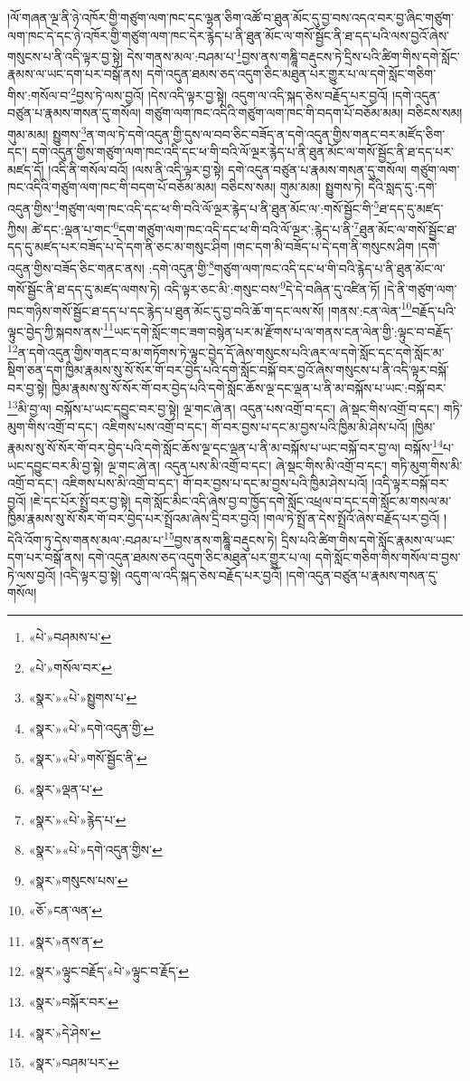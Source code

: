 །ལོ་གཞན་ལྔ་ནི་ཉེ་འཁོར་གྱི་གཙུག་ལག་ཁང་དང་ལྷན་ཅིག་འཚོ་བ་ཐུན་མོང་དུ་བྱ་བས་འདའ་བར་བྱ་ཞིང་གཙུག་ལག་ཁང་དེ་དང་ཉེ་འཁོར་གྱི་གཙུག་ལག་ཁང་དེར་རྙེད་པ་ནི་ཐུན་མོང་ལ་གསོ་སྦྱོང་ནི་ཐ་དད་པའི་ལས་བྱའོ་ཞེས་གསུངས་པ་ནི་འདི་ལྟར་བྱ་སྟེ། དེས་གནས་མལ་:བཤམ་པ་\footnote{«པེ་»བཤམས་པ་}བྱས་ནས་གཎྜཱི་བརྡུངས་ཏེ་དྲིས་པའི་ཚིག་གིས་དགེ་སློང་རྣམས་ལ་ཡང་དག་པར་བསྒོ་ནས། དགེ་འདུན་ཐམས་ཅད་འདུག་ཅིང་མཐུན་པར་གྱུར་པ་ལ་དགེ་སློང་གཅིག་གིས་:གསོལ་བ་\footnote{«པེ་»གསོལ་བར་}བྱས་ཏེ་ལས་བྱའོ། །དེས་འདི་ལྟར་བྱ་སྟེ། འདུག་ལ་འདི་སྐད་ཅེས་བརྗོད་པར་བྱའོ། །དགེ་འདུན་བཙུན་པ་རྣམས་གསན་དུ་གསོལ། གཙུག་ལག་ཁང་འདིའི་གཙུག་ལག་ཁང་གི་བདག་པོ་བཅོམ་མམ། བཅིངས་སམ། གུམ་མམ། སྤྱུགས་\footnote{«སྣར་»«པེ་»སྤྱུགས་པ་}ན་གལ་ཏེ་དགེ་འདུན་གྱི་དུས་ལ་བབ་ཅིང་བཟོད་ན་དགེ་འདུན་གྱིས་གནང་བར་མཛོད་ཅིག་དང་། དགེ་འདུན་གྱིས་གཙུག་ལག་ཁང་འདི་དང་ཕ་གི་བའི་ལོ་ལྔར་རྙེད་པ་ནི་ཐུན་མོང་ལ་གསོ་སྦྱོང་ནི་ཐ་དད་པར་མཛད་དོ། །འདི་ནི་གསོལ་བའོ། །ལས་ནི་འདི་ལྟར་བྱ་སྟེ། དགེ་འདུན་བཙུན་པ་རྣམས་གསན་དུ་གསོལ། གཙུག་ལག་ཁང་འདིའི་གཙུག་ལག་ཁང་གི་བདག་པོ་བཅོམ་མམ། བཅིངས་སམ། གུམ་མམ། སྤྱུགས་ཏེ། དེའི་སླད་དུ་:དགེ་འདུན་གྱིས་\footnote{«སྣར་»«པེ་»དགེ་འདུན་གྱི་}གཙུག་ལག་ཁང་འདི་དང་ཕ་གི་བའི་ལོ་ལྔར་རྙེད་པ་ནི་ཐུན་མོང་ལ་:གསོ་སྦྱོང་གི་\footnote{«སྣར་»«པེ་»གསོ་སྦྱོང་ནི་}ཐ་དད་དུ་མཛད་ཀྱིས། ཚེ་དང་:ལྡན་པ་གང་\footnote{«སྣར་»ལྡན་པ་}དག་གཙུག་ལག་ཁང་འདི་དང་ཕ་གི་བའི་ལོ་ལྔར་:རྙེད་པ་ནི་\footnote{«སྣར་»«པེ་»རྙེད་པ་}ཐུན་མོང་ལ་གསོ་སྦྱོང་ཐ་དད་དུ་མཛད་པར་བཟོད་པ་དེ་དག་ནི་ཅང་མ་གསུང་ཤིག །གང་དག་མི་བཟོད་པ་དེ་དག་ནི་གསུངས་ཤིག །དགེ་འདུན་གྱིས་བཟོད་ཅིང་གནང་ནས། :དགེ་འདུན་གྱི་\footnote{«སྣར་»«པེ་»དགེ་འདུན་གྱིས་}གཙུག་ལག་ཁང་འདི་དང་ཕ་གི་བའི་རྙེད་པ་ནི་ཐུན་མོང་ལ་གསོ་སྦྱོང་ནི་ཐ་དད་དུ་མཛད་ལགས་ཏེ། འདི་ལྟར་ཅང་མི་:གསུང་བས་\footnote{«སྣར་»གསུངས་པས་}དེ་དེ་བཞིན་དུ་འཛིན་ཏོ། །དེ་ནི་གཙུག་ལག་ཁང་གཉིས་གསོ་སྦྱོང་ཐ་དད་པ་དང་རྙེད་པ་ཐུན་མོང་དུ་བྱ་བའི་ཆོ་ག་དང་ལས་སོ། །གནས་:ངན་ལེན་\footnote{«ཅོ་»ངན་ལན་}བརྗོད་པའི་ལྟུང་བྱེད་ཀྱི་སྐབས་ནས་\footnote{«སྣར་»ནས་ན་}ཡང་དགེ་སློང་གང་ཟག་བསྙེན་པར་མ་རྫོགས་པ་ལ་གནས་ངན་ལེན་གྱི་:ལྟུང་བ་བརྗོད་\footnote{«སྣར་»ལྟུང་བརྗོད་«པེ་»ལྟུང་བ་རྗོད་}ན་དགེ་འདུན་གྱིས་གནང་བ་མ་གཏོགས་ཏེ་ལྟུང་བྱེད་དོ་ཞེས་གསུངས་པའི་ཞར་ལ་དགེ་སློང་དང་དགེ་སློང་མ་སྡིག་ཅན་དག་ཁྱིམ་རྣམས་སུ་སོ་སོར་གོ་བར་བྱེད་པའི་དགེ་སློང་བསྐོ་བར་བྱའོ་ཞེས་གསུངས་པ་ནི་འདི་ལྟར་བསྐོ་བར་བྱ་སྟེ། ཁྱིམ་རྣམས་སུ་སོ་སོར་གོ་བར་བྱེད་པའི་དགེ་སློང་ཆོས་ལྔ་དང་ལྡན་པ་ནི་མ་བསྐོས་པ་ཡང་:བསྐོ་བར་\footnote{«སྣར་»བསྐོར་བར་}མི་བྱ་ལ། བསྐོས་པ་ཡང་དབྱུང་བར་བྱ་སྟེ། ལྔ་གང་ཞེ་ན། འདུན་པས་འགྲོ་བ་དང་། ཞེ་སྡང་གིས་འགྲོ་བ་དང་། གཏི་མུག་གིས་འགྲོ་བ་དང་། འཇིགས་པས་འགྲོ་བ་དང་། གོ་བར་བྱས་པ་དང་མ་བྱས་པའི་ཁྱིམ་མི་ཤེས་པའོ། །ཁྱིམ་རྣམས་སུ་སོ་སོར་གོ་བར་བྱེད་པའི་དགེ་སློང་ཆོས་ལྔ་དང་ལྡན་པ་ནི་མ་བསྐོས་པ་ཡང་བསྐོ་བར་བྱ་ལ། བསྐོས་\footnote{«སྣར་»དེ་ཤེས་}པ་ཡང་དབྱུང་བར་མི་བྱ་སྟེ། ལྔ་གང་ཞེ་ན། འདུན་པས་མི་འགྲོ་བ་དང་། ཞེ་སྡང་གིས་མི་འགྲོ་བ་དང་། གཏི་མུག་གིས་མི་འགྲོ་བ་དང་། འཇིགས་པས་མི་འགྲོ་བ་དང་། གོ་བར་བྱས་པ་དང་མ་བྱས་པའི་ཁྱིམ་ཤེས་པའོ། །འདི་ལྟར་བསྐོ་བར་བྱའོ། །ཇེ་དང་པོར་སྤྲོ་བར་བྱ་སྟེ། དགེ་སློང་མིང་འདི་ཞེས་བྱ་བ་ཁྱོད་དགེ་སློང་འཕྲལ་བ་དང་དགེ་སློང་མ་གསལ་མ་ཁྱིམ་རྣམས་སུ་སོ་སོར་གོ་བར་བྱེད་པར་སྤྲོའམ་ཞེས་དྲི་བར་བྱའོ། །གལ་ཏེ་སྤྲོ་ན་དེས་སྤྲོའོ་ཞེས་བརྗོད་པར་བྱའོ། །དེའི་འོག་ཏུ་དེས་གནས་མལ་:བཤམ་པ་\footnote{«སྣར་»བཤམ་པར་}བྱས་ནས་གཎྜཱི་བརྡུངས་ཏེ། དྲིས་པའི་ཚིག་གིས་དགེ་སློང་རྣམས་ལ་ཡང་དག་པར་བསྒོ་ནས། དགེ་འདུན་ཐམས་ཅད་འདུག་ཅིང་མཐུན་པར་གྱུར་པ་ལ། དགེ་སློང་གཅིག་གིས་གསོལ་བ་བྱས་ཏེ་ལས་བྱའོ། །འདི་ལྟར་བྱ་སྟེ། འདུག་ལ་འདི་སྐད་ཅེས་བརྗོད་པར་བྱའོ། །དགེ་འདུན་བཙུན་པ་རྣམས་གསན་དུ་གསོལ། 